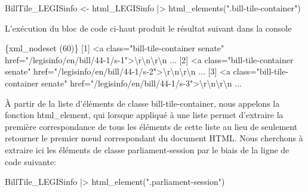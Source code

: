 \documentclass[
  letterpaper,
  DIV=11,
  numbers=noendperiod]{scrreprt}
\newenvironment{Shaded}{\begin{snugshade}}{\end{snugshade}}
\newcommand{\DataTypeTok}[1]{\textcolor[rgb]{0.68,0.00,0.00}{#1}}
\newcommand{\ErrorTok}[1]{\textcolor[rgb]{0.68,0.00,0.00}{#1}}
\newcommand{\ExtensionTok}[1]{\textcolor[rgb]{0.00,0.23,0.31}{#1}}
\newcommand{\KeywordTok}[1]{\textcolor[rgb]{0.00,0.23,0.31}{#1}}
\newcommand{\NormalTok}[1]{\textcolor[rgb]{0.00,0.23,0.31}{#1}}
\newcommand{\OperatorTok}[1]{\textcolor[rgb]{0.37,0.37,0.37}{#1}}
\newcommand{\StringTok}[1]{\textcolor[rgb]{0.13,0.47,0.30}{#1}}
\begin{document}
\begin{Shaded}
\begin{Highlighting}[]
\ExtensionTok{BillTile\_LEGISinfo} \OperatorTok{\textless{}}\NormalTok{{-} html\_LEGISinfo }\KeywordTok{|}\OperatorTok{\textgreater{}}\NormalTok{ html\_elements}\KeywordTok{(}\StringTok{".bill{-}tile{-}container"}\KeywordTok{)}
\end{Highlighting}
\end{Shaded}

L'exécution du bloc de code ci-haut produit le résultat suivant dans la
console

\begin{Shaded}
\begin{Highlighting}[]
\ExtensionTok{\{xml\_nodeset} \ErrorTok{(}\ExtensionTok{60}\KeywordTok{)}\ErrorTok{\}}
 \ExtensionTok{[1]} \OperatorTok{\textless{}}\NormalTok{a class=}\StringTok{"bill{-}tile{-}container senate"}\NormalTok{ href=}\StringTok{"/legisinfo/en/bill/44{-}1/s{-}1"}\OperatorTok{\textgreater{}}\DataTypeTok{\textbackslash{}r\textbackslash{}n\textbackslash{}r\textbackslash{}n}\NormalTok{     ...}
 \ExtensionTok{[2]} \OperatorTok{\textless{}}\NormalTok{a class=}\StringTok{"bill{-}tile{-}container senate"}\NormalTok{ href=}\StringTok{"/legisinfo/en/bill/44{-}1/s{-}2"}\OperatorTok{\textgreater{}}\DataTypeTok{\textbackslash{}r\textbackslash{}n\textbackslash{}r\textbackslash{}n}\NormalTok{     ...}
 \ExtensionTok{[3]} \OperatorTok{\textless{}}\NormalTok{a class=}\StringTok{"bill{-}tile{-}container senate"}\NormalTok{ href=}\StringTok{"/legisinfo/en/bill/44{-}1/s{-}3"}\OperatorTok{\textgreater{}}\DataTypeTok{\textbackslash{}r\textbackslash{}n\textbackslash{}r\textbackslash{}n}\NormalTok{     ...}
\end{Highlighting}
\end{Shaded}

À partir de la liste d'éléments de classe bill-tile-container, nous
appelons la fonction html\_element, qui lorsque appliqué à une liste
permet d'extraire la première correspondance de tous les éléments de
cette liste au lieu de seulement retourner le premier nœud correspondant
du document HTML. Nous cherchons à extraire ici les éléments de classe
parliament-session par le biais de la ligne de code suivante:

\begin{Shaded}
\begin{Highlighting}[]
\ExtensionTok{BillTile\_LEGISinfo} \KeywordTok{|}\OperatorTok{\textgreater{}}\NormalTok{ html\_element}\KeywordTok{(}\StringTok{".parliament{-}session"}\KeywordTok{)} 
\end{Highlighting}
\end{Shaded}
\end{document}
